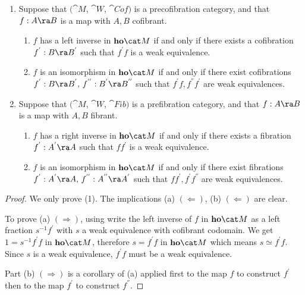 \begin{lem}[Cisinski]
\label{lem::cofcatequivinhomotcat}
\mbox{}
\begin{enumerate}
\item
Suppose that $({\cat M}$, ${\cat W}$, ${\cat Cof})$ is a precofibration category, and that $f:A \ra B$ is a map with $A, B$ cofibrant.
\begin{enumerate}
\item
$f$ has a left inverse in ${\bf ho}{\cat M}$ if and only if there exists a cofibration $f^{'}:B \ra B^{'}$ such that $f^{'}f$ is a weak equivalence.
\item
$f$ is an isomorphism in ${\bf ho}{\cat M}$ if and only if there exist cofibrations $f^{'}:B \ra B^{'}, \, f^{''}:B^{'} \ra B^{''}$ such that $f^{'}f, f^{''}f^{'}$ are weak equivalences.
\end{enumerate}
\item
Suppose that $({\cat M}$, ${\cat W}$, ${\cat Fib})$ is a prefibration category, and that $f:A \ra B$ is a map with $A, B$ fibrant.
\begin{enumerate}
\item
$f$ has a right inverse in ${\bf ho}{\cat M}$ if and only if there exists a fibration $f^{'}:A^{'} \ra A$ such that $ff^{'}$ is a weak equivalence.
\item
$f$ is an isomorphism in ${\bf ho}{\cat M}$ if and only if there exist fibrations $f^{'}:A^{'} \ra A, \, f^{''}:A^{''} \ra A^{'}$ such that $ff^{'}, f^{'}f^{''}$ are weak equivalences.
\end{enumerate}
\end{enumerate}
\end{lem}

\begin{proof}
We only prove (1). The implications (a) $(\Leftarrow)$, (b) $(\Leftarrow)$ are clear. 

To prove (a) $(\Rightarrow)$, using  write the left inverse of $f$ in ${\bf ho}{\cat M}$ as a left fraction $s^{-1}f^{'}$ with $s$ a weak equivalence with cofibrant codomain. We get $1 = s^{-1}f^{'}f$ in ${\bf ho}{\cat M}$, therefore $s = f^{'}f$ in ${\bf ho}{\cat M}$ which means $s \simeq f^{'}f$. Since $s$ is a weak equivalence, $f^{'}f$ must be a weak equivalence.

Part (b) $(\Rightarrow)$ is a corollary of (a) applied first to the map $f$ to construct $f^{'}$ then to the map $f^{'}$ to construct $f^{''}$.
\end{proof}

